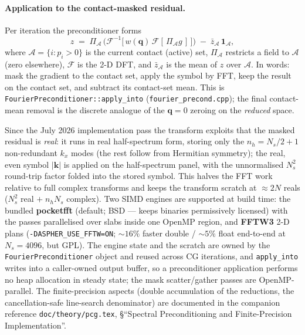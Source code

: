 \documentclass[11pt,a4paper]{article}
\newcommand{\abs}[1]{\left\lvert #1 \right\rvert}
\newcommand{\code}[1]{\texttt{#1}}
\theoremstyle{definition}
\theoremstyle{remark}
\begin{document}
\paragraph{Application to the contact-masked residual.}
Per iteration the preconditioner forms
\begin{equation}
  z \;=\; \Pi_{\mathcal A}\,\Big(\mathcal F^{-1}\big[\,w(\mathbf q)\,\mathcal F[\,
  \Pi_{\mathcal A} g\,]\,\big]\Big)\;-\;\bar z_{\mathcal A}\,\mathbf 1_{\mathcal A},
  \label{eq:apply}
\end{equation}
where $\mathcal A=\{i:p_i>0\}$ is the current contact (active) set,
$\Pi_{\mathcal A}$ restricts a field to $\mathcal A$ (zero elsewhere),
$\mathcal F$ is the 2-D DFT, and $\bar z_{\mathcal A}$ is the mean of $z$ over
$\mathcal A$. In words: mask the gradient to the contact set, apply the symbol by
FFT, keep the result on the contact set, and subtract its contact-set mean. This
is \code{FourierPreconditioner::apply\_into} (\code{fourier\_precond.cpp}); the
final contact-mean removal is the discrete analogue of the $\mathbf q=0$ zeroing
on the \emph{reduced} space.

Since the July 2026 implementation pass the transform exploits that the masked
residual is \emph{real}: it runs in real half-spectrum form, storing only the
$n_h=N_s/2+1$ non-redundant $k_x$ modes (the rest follow from Hermitian
symmetry); the real, even symbol $\abs{\mathbf k}$ is applied on the
half-spectrum panel, with the unnormalised $N_s^2$ round-trip factor folded
into the stored symbol. This halves the FFT work relative to full complex
transforms and keeps the transform scratch at ${\approx}2N$ reals ($N_s^2$
real $+\;n_hN_s$ complex). Two SIMD engines are supported at build time: the
bundled \textbf{pocketfft} (default; BSD --- keeps binaries permissively
licensed) with the passes parallelised over slabs inside one OpenMP region,
and \textbf{FFTW3} 2-D plans (\code{-DASPHER\_USE\_FFTW=ON}; ${\sim}16\%$
faster double / ${\sim}5\%$ float end-to-end at $N_s=4096$, but GPL). The
engine state and the scratch are owned by the \code{FourierPreconditioner}
object and reused across CG iterations, and \code{apply\_into} writes into a
caller-owned output buffer, so a preconditioner application performs no heap
allocation in steady state; the mask scatter/gather passes are
OpenMP-parallel. The finite-precision aspects (double accumulation of the
reductions, the cancellation-safe line-search denominator) are documented in
the companion reference \code{doc/theory/pcg.tex}, \S``Spectral
Preconditioning and Finite-Precision Implementation''.
\end{document}
